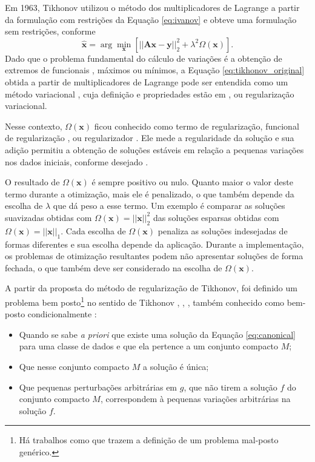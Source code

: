 Em 1963, Tikhonov \cite[pág. 57]{tikhonov1977solutions} utilizou o método dos multiplicadores de Lagrange a partir da formulação com restrições da Equação \eqref{eq:ivanov} e obteve uma formulação sem restrições, conforme 
\begin{equation}
\hat{\mathbf{x}} = \arg\min\limits_{\mathbf{x}} \left[ \vert \vert \mathbf{A} \mathbf{x} - \mathbf{y} \vert \vert^2_2 + \lambda^2 \Omega(\mathbf{x}) \right].
\label{eq:tikhonov_original}
\end{equation}
Dado que o problema fundamental do cálculo de variações é a obtenção de extremos de funcionais \cite[pág. 3]{komzsik2020applied}, máximos ou mínimos, a Equação \eqref{eq:tikhonov_original} obtida a partir de multiplicadores de Lagrange pode ser entendida como um método variacional \cite[Teorema 5.1]{engl1996regularization}, cuja definição e propriedades estão em \cite[págs. 20-9]{Benning2018}, ou regularização variacional.

Nesse contexto, $\Omega(\mathbf{x})$ ficou conhecido como termo de regularização, funcional de regularização \cite[pág. 8]{Benning2018}, ou regularizador \cite[pág. 1129]{Caselle2011}. Ele mede a regularidade da solução \cite[págs. 61, 172]{hansen2010discrete} e sua adição permitiu a obtenção de soluções estáveis em relação a pequenas variações nos dados iniciais, conforme desejado \cite[págs. 22, 47]{tikhonov1977solutions}. 

O resultado de $\Omega(\mathbf{x})$ é sempre positivo ou nulo. Quanto maior o valor deste termo durante a otimização, mais ele é penalizado, o que também depende da escolha de $\lambda$ que dá peso a esse termo. Um exemplo é comparar as soluções suavizadas obtidas com $\Omega(\mathbf{x}) = \vert\vert \mathbf{x} \vert\vert_2^2$ das soluções esparsas obtidas com $\Omega(\mathbf{x}) = \vert\vert \mathbf{x} \vert\vert_1$. Cada escolha de $\Omega(\mathbf{x})$ penaliza as soluções indesejadas de formas diferentes e sua escolha depende da aplicação. Durante a implementação, os problemas de otimização resultantes podem não apresentar soluções de forma fechada, o que também deve ser considerado na escolha de $\Omega(\mathbf{x})$. 

A partir da proposta do método de regularização de Tikhonov, foi definido um problema bem posto\footnote{Há trabalhos como \cite[Capítulo 3]{Dontchev1993} que trazem a definição de um problema mal-posto genérico.} no sentido de Tikhonov \cite[Capítulo 1]{Dontchev1993}, \cite[pág. 4]{Lavrentiev1967}, \cite[págs. 30-1]{tikhonov1977solutions}, também conhecido como bem-posto condicionalmente \cite[pág. 16]{glasko1988inverse}: 
\begin{itemize}
\item Quando se sabe \textit{a priori} que existe uma solução da Equação \eqref{eq:canonical} para uma classe de dados e que ela pertence a um conjunto compacto $M$; 
\item Que nesse conjunto compacto $M$ a solução é única; 
\item Que pequenas perturbações arbitrárias em $g$, que não tirem a solução $f$ do conjunto compacto $M$, correspondem à pequenas variações arbitrárias na solução $f$.
\end{itemize}

